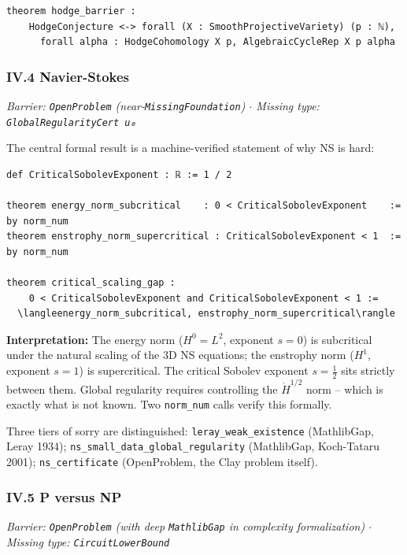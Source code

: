 \documentclass[12pt,a4paper]{article}
\begin{document}
\begin{lstlisting}[language=lean]
theorem hodge_barrier :
    HodgeConjecture <-> forall (X : SmoothProjectiveVariety) (p : ℕ),
      forall alpha : HodgeCohomology X p, AlgebraicCycleRep X p alpha
\end{lstlisting}

\subsubsection{IV.4 Navier-Stokes}

\emph{Barrier: \texttt{OpenProblem} (near-\texttt{MissingFoundation}) $\cdot$ Missing type: \texttt{GlobalRegularityCert u₀}}

The central formal result is a machine-verified statement of why NS is hard:

\begin{lstlisting}[language=lean]
def CriticalSobolevExponent : ℝ := 1 / 2

theorem energy_norm_subcritical    : 0 < CriticalSobolevExponent    := by norm_num
theorem enstrophy_norm_supercritical : CriticalSobolevExponent < 1  := by norm_num

theorem critical_scaling_gap :
    0 < CriticalSobolevExponent and CriticalSobolevExponent < 1 :=
  \langleenergy_norm_subcritical, enstrophy_norm_supercritical\rangle
\end{lstlisting}

\textbf{Interpretation:} The energy norm ($H^0 = L^2$, exponent $s = 0$) is subcritical under the natural scaling of the 3D NS equations; the enstrophy norm ($H^1$, exponent $s = 1$) is supercritical. The critical Sobolev exponent $s = \frac{1}{2}$ sits strictly between them. Global regularity requires controlling the $\dot{H}^{1/2}$ norm  --  which is exactly what is not known. Two \texttt{norm\_num} calls verify this formally.

Three tiers of sorry are distinguished: \texttt{leray\_weak\_existence} (MathlibGap, Leray 1934); \texttt{ns\_small\_data\_global\_regularity} (MathlibGap, Koch-Tataru 2001); \texttt{ns\_certificate} (OpenProblem, the Clay problem itself).

\subsubsection{IV.5 P versus NP}

\emph{Barrier: \texttt{OpenProblem} (with deep \texttt{MathlibGap} in complexity formalization) $\cdot$ Missing type: \texttt{CircuitLowerBound \epsilon}}
\end{document}
